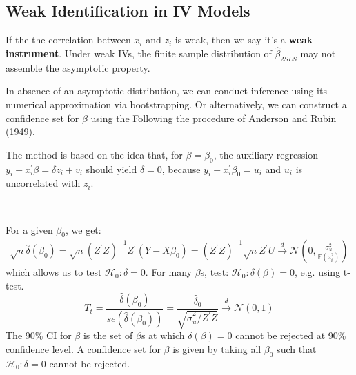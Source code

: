 \subsection{Weak Identification in IV Models}

If the the correlation between $x_i$ and $z_i$ is weak, then we say it's a \textbf{weak instrument}.
Under weak IVs, the finite sample distribution of $\hat{\beta}_{2SLS}$ may not assemble the asymptotic property.

In absence of an asymptotic distribution, we can conduct inference using its numerical approximation via bootstrapping.
Or alternatively, we can construct a confidence set for $\beta$ using the Following the procedure of Anderson and Rubin (1949).

The method is based on the idea that, for $\beta = \beta_0$, the auxiliary regression $y_i - x_i^{\prime} \beta = \delta z_i + v_i$ should yield $\delta =0$,
because $y_i - x_i^{\prime} \beta_0 = u_i$ and $u_i$ is uncorrelated with $z_i$.

\begin{theorem}\label{thm:IV-AR}
    \
    
    For a given $\beta_0$, we get:
    \begin{gather*}
        \sqrt{n} \hat{\delta}(\beta_0) = \sqrt{n} \left(Z^{\prime} Z \right)^{-1} Z^{\prime} (Y - X \beta_0) = \left(Z^{\prime} Z\right)^{-1} \sqrt{n} Z^{\prime} U \overset{d}{\rightarrow} \mathcal{N} \left(0, \frac{\sigma_u^2}{\mathbb{E}(z_i^2)} \right)
    \end{gather*}
    which allows us to test $\mathcal{H}_0: \delta =0.$
    For many $\beta$s, test: $\mathcal{H}_0: \delta(\beta) = 0$, e.g. using t-test.
    \[T_t = \frac{\hat{\delta}(\beta_0)}{se(\hat{\delta}(\beta_0))} = \frac{\hat{\delta}_0}{\sqrt{\hat{\sigma}_u^2 / Z^{\prime} Z} } \overset{d}{\rightarrow} \mathcal{N}(0,1)\]
    The 90\% CI for $\beta$ is the set of $\beta$s at which $\delta(\beta) = 0$ cannot be rejected at 90\% confidence level.
    A confidence set for $\beta$ is given by taking all $\beta_0$ such that $\mathcal{H}_0: \delta =0$ cannot be rejected.
\end{theorem}

